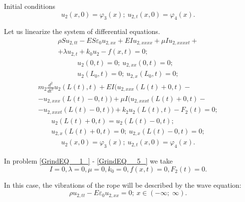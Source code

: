 Initial conditions
$$u_{2} (x,0)=\varphi _{3} (x); \ u_{2,t} (x,0)=\varphi _{4} (x).$$ 

Let us linearize the system of differential equations.
\begin{equation} \label{GrindEQ__1_}
    \begin{gathered}
        \rho Su_{2,tt} -ES\varepsilon _{0} u_{2,xx} +EIu_{2,xxxx} +\mu Iu_{2,xxxxt}+ \\
        +\lambda u_{2,t} +k_{0} u_{2} -f(x,t)=0;
    \end{gathered}
\end{equation} 
\begin{equation} \label{GrindEQ__2_}
    \begin{gathered}
        u_{2} (0,t)=0; \ u_{2,xx} (0,t)=0; \\
        u_{2} (L_{0} ,t)=0; \ u_{2,x} (L_{0} ,t)=0;
    \end{gathered}
\end{equation} 
\begin{equation} \label{GrindEQ__3_}
    \begin{gathered}
        m_{2} \frac{d^{2} }{dt^{2} } u_{2} \left(L(t),t\right)+EI(u_{2,xxx} \left(L(t)+0,t\right)- \\
        -u_{2,xxx} \left(L(t)-0,t\right))+\mu I(u_{2,xxxt} \left(L(t)+0,t\right)- \\
        -u_{2,xxxt} \left(L(t)-0,t\right))+k_{2} u_{2} \left(L(t),t\right)-F_{2} (t)=0;
    \end{gathered}
\end{equation} 
\begin{equation} \label{GrindEQ__4_}
    \begin{gathered}
        u_{2} \left(L(t)+0,t\right)=u_{2} \left(L(t)-0,t\right); \\
        u_{2,x} \left(L(t)+0,t\right)=0; \ u_{2,x} \left(L(t)-0,t\right)=0;
    \end{gathered}
\end{equation} 
\begin{equation} \label{GrindEQ__5_}
    \begin{gathered}
        u_{2} (x,0)=\varphi _{3} (x); \ u_{2,t} (x,0)=\varphi _{4} (x).
    \end{gathered}
\end{equation} 

In problem \eqref{GrindEQ__1_} - \eqref{GrindEQ__5_} we take
$$I=0, \lambda =0, \mu =0, k_{0} =0, f(x,t)=0, F_{2} (t)=0.$$

In this case, the vibrations of the rope will be described by the wave equation:
\begin{equation} \label{GrindEQ__6_} 
\rho u_{2,tt} -E\varepsilon _{0} u_{2,xx} =0; \ x\in \left(-\infty ;\; \infty \right).                                             
\end{equation} 

